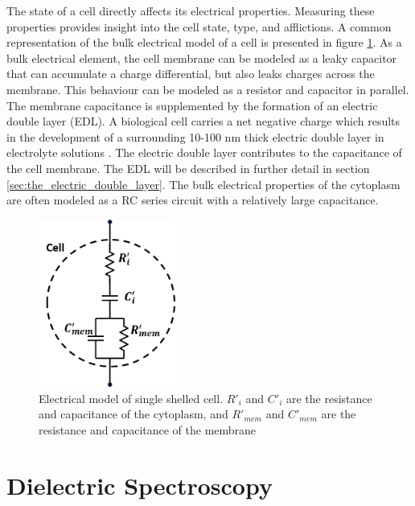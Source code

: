 \par The state of a cell directly affects its electrical properties. Measuring these properties provides insight into the cell state, type, and afflictions. A common representation of the bulk electrical model of a cell is presented in figure \ref{fig:electric_model_cell}. As a bulk electrical element, the cell membrane can be modeled as a leaky capacitor that can accumulate a charge differential, but also leaks charges across the membrane. This behaviour can be modeled as a resistor and capacitor in parallel. The membrane capacitance is supplemented by the formation of an electric double layer (EDL). A biological cell carries a net negative charge which results in the development of a surrounding 10-100 nm thick electric double layer in electrolyte solutions \cite{swaminathan_effect_2009}. The electric double layer contributes to the capacitance of the cell membrane. The EDL will be described in further detail in section \ref{sec:the_electric_double_layer}. The bulk electrical properties of the cytoplasm are often modeled as a RC series circuit with a relatively large capacitance. 

\begin{figure}
    \centering
    \includegraphics[width=0.4\textwidth]{images/completeCellCircuit.png}
    \caption[Electrical model of single shelled cell.]{Electrical model of single shelled cell. $R'_i$ and $C'_i$ are the resistance and capacitance of the cytoplasm, and $R'_{mem}$ and $C'_{mem}$ are the resistance and capacitance of the membrane}
    \label{fig:electric_model_cell}
\end{figure}
 
 \section{Dielectric Spectroscopy}

